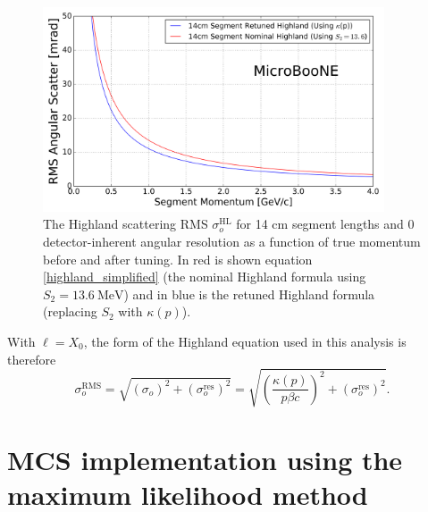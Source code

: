 \documentclass[a4paper,11pt]{article}
\begin{document}
\begin{figure}[ht!]
\begin{center}
\includegraphics[width=0.9\textwidth]{Figures/highland_formula_visualized_twoforms.png}
\end{center}
\caption{The Highland scattering RMS $\sigma_o^{\text{HL}}$ for 14 cm segment lengths and 0 detector-inherent angular resolution as a function of true momentum before and after tuning. In red is shown equation \ref{highland_simplified} (the nominal Highland formula using $S_2 = 13.6~\text{MeV}$) and in blue is the retuned Highland formula (replacing $S_2$ with $\kappa(p)$).}
\label{retune_highland_fig2}
\end{figure}

With ${\ell} = X_0$, the form of the Highland equation used in this analysis is therefore
\begin{equation}\label{modified_highland_eqtn_kappa}
\sigma_{o}^{\text{RMS}} = \sqrt{ (\sigma_o)^2 + (\sigma_o^{\text{res}})^2} = \sqrt{ \left(\frac{\kappa(p)}{p\beta c}\right)^2 + (\sigma_o^{\text{res}})^2 }.
\end{equation}












\section{MCS implementation using the maximum likelihood method}\label{MCS_technique_section}
\end{document}
